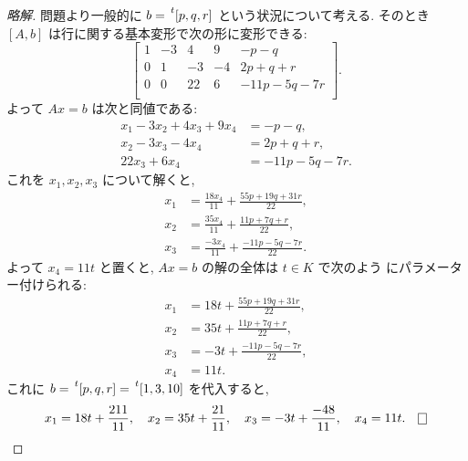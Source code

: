 \documentclass[12pt,twoside]{jarticle}
\newcommand\commentout[1]{#1}
\newcommand\commentout[1]{}
\begin{document}
\commentout{
\begin{proof}[略解]
  問題より一般的に $b=\tp{[p,q,r]}$ という状況について考える.
  そのとき $[A,b]$ は行に関する基本変形で次の形に変形できる:
  \begin{equation*}
    \left[
      \begin{array}{cccc|c}
        1 & -3 &  4 &  9 & -p-q \\
        0 &  1 & -3 & -4 & 2p+q+r \\
        0 &  0 & 22 &  6 & -11p-5q-7r \\
      \end{array}
    \right].
  \end{equation*}
  よって $Ax=b$ は次と同値である:
  \begin{align*}
    x_1 -3x_2 + 4x_3 + 9x_4 &= -p-q, \\
          x_2 - 3x_3 - 4x_4 &= 2p+q+r, \\
               22x_3 + 6x_4 &= -11p-5q-7r. 
  \end{align*}
  これを $x_1,x_2,x_3$ について解くと,
  \begin{align*}
    x_1 &= \frac{18x_4}{11} + \frac{55p+19q+31r}{22},
    \\
    x_2 &= \frac{35x_4}{11} + \frac{11p+7q+r}{22},
    \\
    x_3 &= \frac{-3x_4}{11} + \frac{-11p-5q-7r}{22}.
  \end{align*}
  よって $x_4=11t$ と置くと, $Ax=b$ の解の全体は $t\in K$ で次のよう
  にパラメーター付けられる:
  \begin{align*}
    x_1 &= 18t + \frac{55p+19q+31r}{22},
    \\
    x_2 &= 35t + \frac{11p+7q+r}{22},
    \\
    x_3 &= -3t + \frac{-11p-5q-7r}{22},
    \\
    x_4 &= 11t.
  \end{align*}
  これに $b=\tp{[p,q,r]}=\tp{[1,3,10]}$ を代入すると,
  \begin{equation*}
    x_1 = 18t + \frac{211}{11},
    \quad
    x_2 = 35t + \frac{21}{11},
    \quad
    x_3 = -3t + \frac{-48}{11},
    \quad
    x_4 = 11t.
    \qed
  \end{equation*}
\end{proof}
}

\end{document}
